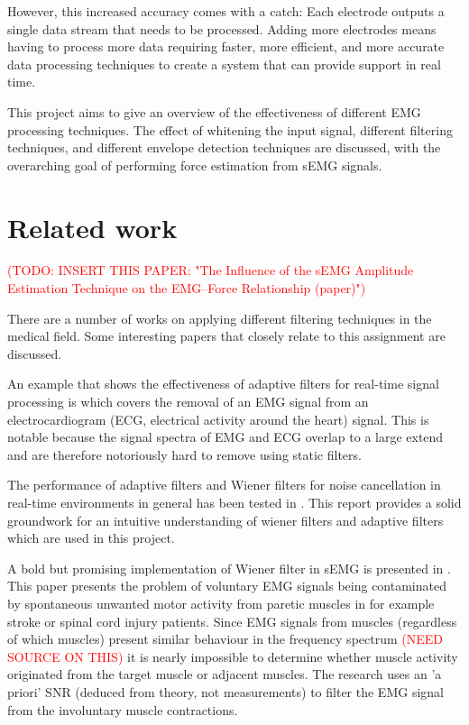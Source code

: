 However, this increased accuracy comes with a catch: Each electrode outputs a single data stream that needs to be processed. Adding more electrodes means having to process more data requiring faster, more efficient, and more accurate data processing techniques to create a system that can provide support in real time.

This project aims to give an overview of the effectiveness of different EMG processing techniques. The effect of whitening the input signal, different filtering techniques, and different envelope detection techniques are discussed, with the overarching goal of performing force estimation from sEMG signals.

\section{Related work}
\textcolor{red}{
(TODO: INSERT THIS PAPER: "The Influence of the sEMG Amplitude Estimation Technique on
the EMG–Force Relationship (paper)")}

There are a number of works on applying different filtering techniques in the medical field. Some interesting papers that closely relate to this assignment are discussed.

An example that shows the effectiveness of adaptive filters for real-time signal processing is \cite{adaptive_filter_emg_noise_cancellation_ecg} which covers the removal of an EMG signal from an electrocardiogram (ECG, electrical activity around the heart) signal. This is notable because the signal spectra of EMG and ECG overlap to a large extend and are therefore notoriously hard to remove using static filters.

The performance of adaptive filters and Wiener filters for noise cancellation in real-time environments in general has been tested in \cite{wiener_vs_adaptive_realtime_noisecancellation}. This report provides a solid groundwork for an intuitive understanding of wiener filters and adaptive filters which are used in this project.

A bold but promising implementation of Wiener filter in sEMG is presented in \cite{wiener_filter_a_priori_semg}. This paper presents the problem of voluntary EMG signals being contaminated by spontaneous unwanted motor activity from paretic muscles in for example stroke or spinal cord injury patients. Since EMG signals from muscles (regardless of which muscles) present similar behaviour in the frequency spectrum \textcolor{red}{(NEED SOURCE ON THIS)} it is nearly impossible to determine whether muscle activity originated from the target muscle or adjacent muscles. The research uses an 'a priori' SNR (deduced from theory, not measurements) to filter the EMG signal from the involuntary muscle contractions. 


